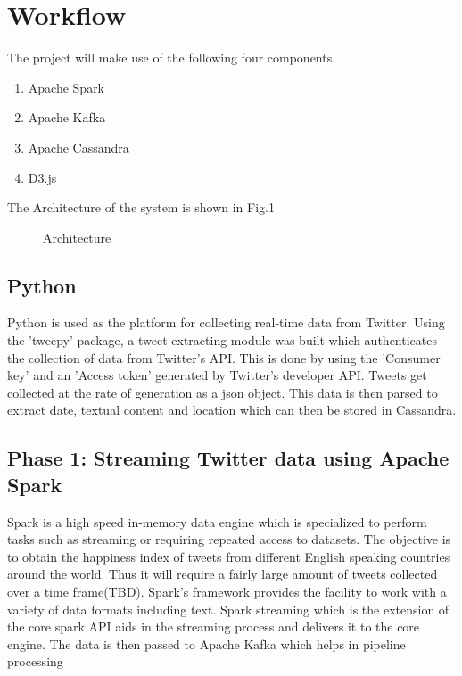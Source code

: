 \documentclass[9pt,twocolumn,twoside]{../../styles/osajnl}
\begin{document}
\section{Workflow}
The project will make use of the following four components. 
\begin{enumerate}
    \item Apache Spark
    \item Apache Kafka
    \item Apache Cassandra
    \item D3.js
\end{enumerate}

The Architecture of the system is shown in Fig.1
\begin{figure}[htbp]
\centering
{}
\caption{Architecture}
\label{fig:false-color}
\end{figure}
\subsection{Python}
Python is used as the platform for collecting real-time data from Twitter. Using the 'tweepy' package, a tweet extracting module was built which authenticates the collection of data from Twitter's API. This is done by using the 'Consumer key' and an 'Access token' generated by Twitter's developer API. Tweets get collected at the rate of generation as a json object. This data is then parsed to extract date, textual content and location which can then be stored in Cassandra.
\subsection{Phase 1: Streaming Twitter data using Apache Spark}
Spark is a high speed in-memory data engine which is specialized to perform tasks such as streaming or requiring repeated access to datasets. The objective is to obtain the happiness index of tweets from different English speaking countries around the world. Thus it will require a fairly large amount of tweets collected over a time frame(TBD). Spark's framework provides the facility to work with a variety of data formats including text. Spark streaming which is the extension of the core spark API aids in the streaming process and delivers it to the core engine. The data is then passed to Apache Kafka which helps in pipeline processing
\end{document}
